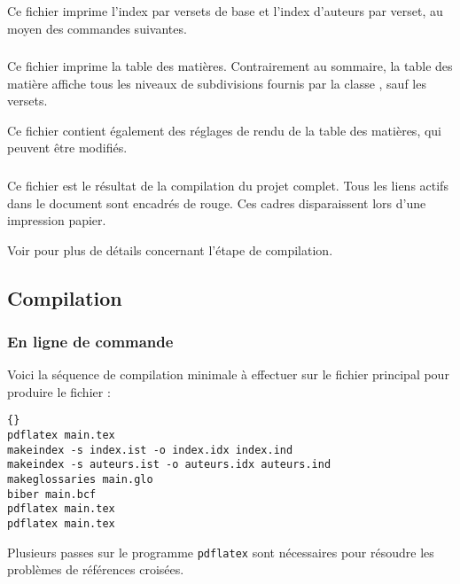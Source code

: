 \documentclass{ltxdockit}
\newcommand*{\classname}{droit-fr\xspace}
\begin{document}
\subsubsection{}

Ce fichier imprime l'index par versets de base et l'index d'auteurs par verset, au moyen des commandes suivantes.
\begin{ltxexample}
\printindexv
\printindexa
\end{ltxexample}

\subsubsection{}

Ce fichier imprime la table des matières. Contrairement au sommaire, la table des matière affiche tous les niveaux de subdivisions fournis par la classe \sty{\classname}, sauf les versets.

Ce fichier contient également des réglages de rendu de la table des matières, qui peuvent être modifiés.

\subsubsection{}

Ce fichier est le résultat de la compilation du projet complet. Tous les liens actifs dans le document sont encadrés de rouge. Ces cadres disparaissent lors d'une impression papier.

Voir  pour plus de détails concernant l'étape de compilation.

\subsection{Compilation}
\label{compilation}

\subsubsection{En ligne de commande}

Voici la séquence de compilation minimale à effectuer sur le fichier principal  pour produire le fichier :

\begin{lstlisting}[style=plain]{}
pdflatex main.tex
makeindex -s index.ist -o index.idx index.ind
makeindex -s auteurs.ist -o auteurs.idx auteurs.ind
makeglossaries main.glo
biber main.bcf
pdflatex main.tex
pdflatex main.tex
\end{lstlisting}
%
Plusieurs passes sur le programme \texttt{pdflatex} sont nécessaires pour résoudre les problèmes de références croisées.
\end{document}

